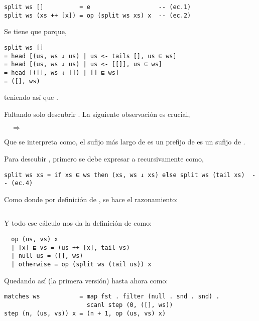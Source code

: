 \begin{verbatim}
split ws []          = e                   -- (ec.1)
split ws (xs ++ [x]) = op (split ws xs) x  -- (ec.2)
\end{verbatim}

Se tiene que  porque, 
\begin{verbatim}
split ws []
= head [(us, ws ↓ us) | us <- tails [], us ⊑ ws]
= head [(us, ws ↓ us) | us <- [[]], us ⊑ ws]
= head [([], ws ↓ []) | [] ⊑ ws]
= ([], ws)
\end{verbatim}

teniendo así que .

Faltando solo descubrir . La siguiente observación es crucial,

 $\quad\Longrightarrow\quad$ 

Que se interpreta como, el sufijo más largo de  es un prefijo de  es un
sufijo de .

Para descubir , primero se debe expresar a  recursivamente como,
\begin{verbatim}
split ws xs = if xs ⊑ ws then (xs, ws ↓ xs) else split ws (tail xs)  -- (ec.4)
\end{verbatim}

Como  donde por definición de ,
se hace el razonamiento:

\inputminted{haskell}{definiciones/kmp/1-op-raz-eq.hs}

Y todo ese cálculo nos da la definición de  como:

\begin{verbatim}
  op (us, vs) x
  | [x] ⊑ vs = (us ++ [x], tail vs)
  | null us = ([], ws)
  | otherwise = op (split ws (tail us)) x
\end{verbatim}

Quedando así (la primera versión) hasta ahora como:

\begin{verbatim}
matches ws           = map fst . filter (null . snd . snd) .
                       scanl step (0, ([], ws))
step (n, (us, vs)) x = (n + 1, op (us, vs) x)
\end{verbatim}

